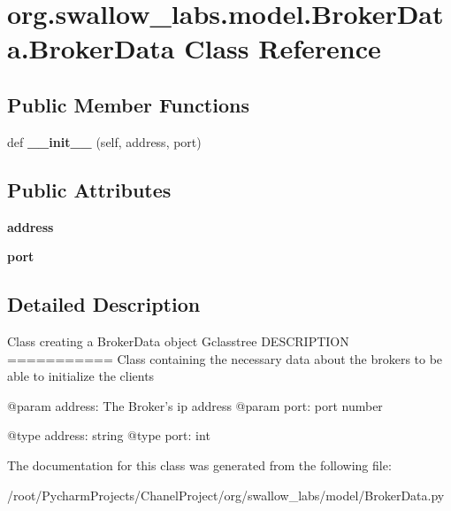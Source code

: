 \hypertarget{classorg_1_1swallow__labs_1_1model_1_1_broker_data_1_1_broker_data}{}\section{org.\+swallow\+\_\+labs.\+model.\+Broker\+Data.\+Broker\+Data Class Reference}
\label{classorg_1_1swallow__labs_1_1model_1_1_broker_data_1_1_broker_data}
\subsection*{Public Member Functions}
\begin{DoxyCompactItemize}
\item 
\hypertarget{classorg_1_1swallow__labs_1_1model_1_1_broker_data_1_1_broker_data_ac4d0b809be4492279d88206f03fe8e70}{}def {\bfseries \+\_\+\+\_\+init\+\_\+\+\_\+} (self, address, port)\label{classorg_1_1swallow__labs_1_1model_1_1_broker_data_1_1_broker_data_ac4d0b809be4492279d88206f03fe8e70}

\end{DoxyCompactItemize}
\subsection*{Public Attributes}
\begin{DoxyCompactItemize}
\item 
\hypertarget{classorg_1_1swallow__labs_1_1model_1_1_broker_data_1_1_broker_data_a5e9fd1b4dd1ca682d73cb2c0d8f18095}{}{\bfseries address}\label{classorg_1_1swallow__labs_1_1model_1_1_broker_data_1_1_broker_data_a5e9fd1b4dd1ca682d73cb2c0d8f18095}

\item 
\hypertarget{classorg_1_1swallow__labs_1_1model_1_1_broker_data_1_1_broker_data_a7267e34808592f541332ee87dd3f0202}{}{\bfseries port}\label{classorg_1_1swallow__labs_1_1model_1_1_broker_data_1_1_broker_data_a7267e34808592f541332ee87dd3f0202}

\end{DoxyCompactItemize}


\subsection{Detailed Description}
\begin{DoxyVerb}    Class creating a BrokerData object
    G{classtree}
    DESCRIPTION
    ===========
    Class containing the necessary data about the brokers to be able to initialize the clients

    @param address:    The Broker's ip address
    @param port:    port number

    @type address: string
    @type port: int
\end{DoxyVerb}
 

The documentation for this class was generated from the following file\+:\begin{DoxyCompactItemize}
\item 
/root/\+Pycharm\+Projects/\+Chanel\+Project/org/swallow\+\_\+labs/model/Broker\+Data.\+py\end{DoxyCompactItemize}
